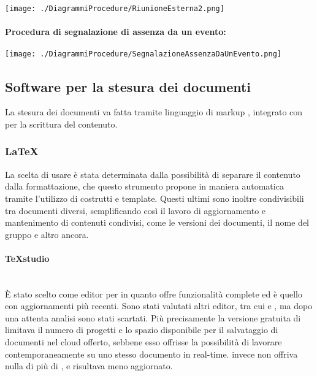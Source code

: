 \begin{center}
	\texttt{[image: ./DiagrammiProcedure/RiunioneEsterna2.png]}
\end{center}

\paragraph{Procedura di segnalazione di assenza da un evento:}

\begin{center}
	\texttt{[image: ./DiagrammiProcedure/SegnalazioneAssenzaDaUnEvento.png]}
\end{center}

\subsection{Software per la stesura dei documenti}
La stesura dei documenti va fatta tramite linguaggio di markup \glossario{\LaTeX{}}, integrato con  per la scrittura del contenuto. 

\subsubsection{\LaTeX}
La scelta di usare \glossario{\LaTeX{}} è stata determinata dalla possibilità di separare il contenuto dalla formattazione, che questo strumento propone in maniera automatica tramite l'utilizzo di costrutti e template. Questi ultimi sono inoltre condivisibili tra documenti diversi, semplificando così il lavoro di aggiornamento e mantenimento di contenuti condivisi, come le versioni dei documenti, il nome del gruppo e altro ancora.

\paragraph{TeXstudio}\mbox{}\\
\`{E} stato scelto  come editor per \glossario{\LaTeX{}} in quanto offre funzionalità complete ed è quello con aggiornamenti più recenti. Sono stati valutati altri editor, tra cui  e , ma dopo una attenta analisi sono stati scartati. Più precisamente la versione gratuita di  limitava il numero di progetti e lo spazio disponibile per il salvataggio di documenti nel cloud offerto, sebbene esso offrisse la possibilità di lavorare contemporaneamente su uno stesso documento in real-time.  invece non offriva nulla di più di , e risultava meno aggiornato.


